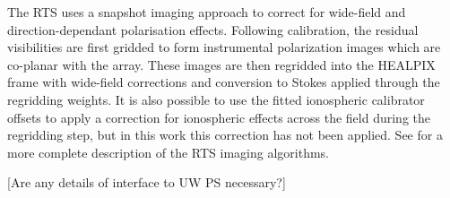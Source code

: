 The RTS uses a snapshot imaging approach to correct for wide-field and direction-dependant polarisation effects. Following calibration, the residual visibilities are first gridded to form instrumental polarization images which are co-planar with the array. These images are then regridded into the HEALPIX frame with wide-field corrections and conversion to Stokes applied through the regridding weights. It is also possible to use the fitted ionospheric calibrator offsets to apply a correction for ionospheric effects across the field during the regridding step, but in this work this correction has not been applied. See \citet{10.1086/657160} for a more complete description of the RTS imaging algorithms.

[Are any details of interface to UW PS necessary?]